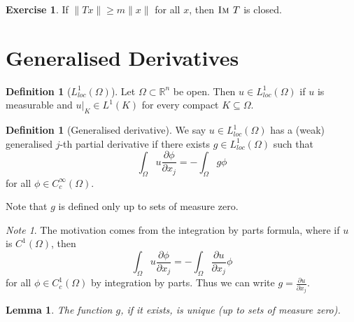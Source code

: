 \documentclass[10pt, oneside, reqno]{amsart}
\theoremstyle{plain}%
\newtheorem{lem}[thm]{Lemma}
\numberwithin{equation}{section}
\theoremstyle{definition}
\newtheorem{defn}[thm]{Definition}
\newtheorem{exer}[thm]{Exercise}
\theoremstyle{remark}
\newtheorem*{note}{Note}
\newcommand{\R}{\mathbb{R}}
\newcommand{\im}{\textsc{Im\ }}
\begin{document}
\begin{exer}
    \label{exer:closed_range_condition}
    If $\| Tx \| \geq m \| x \|$ for all $x$, then $\im T$ is closed.
\end{exer}

\section{Generalised Derivatives} %
\label{sec:generalised_derivatives}

\begin{defn}[$L^1_{loc}(\Omega)$]
    Let $\Omega \subset \R^n$ be open.  Then $u \in L^1_{loc}(\Omega)$ if $u$ is measurable and $u|_K \in L^1(K)$ for every compact $K \subseteq \Omega$. 
\end{defn}

\begin{defn}[Generalised derivative]
    We say $u \in L^1_{loc}(\Omega)$ has a (weak) generalised $j$-th partial derivative if there exists $g \in L^1_{loc}(\Omega)$ such that \begin{equation}
    \label{eq:generalised_derivative}
        \int_\Omega u \frac{\partial \phi}{\partial x_j} = - \int_\Omega g \phi
    \end{equation}
    for all $\phi \in C_c^\infty(\Omega)$.
    
    Note that $g$ is defined only up to sets of measure zero.
\end{defn}

\begin{note}
    The motivation comes from the integration by parts formula, where if $u$ is $C^1(\Omega)$, then \[
        \int_\Omega u \frac{\partial \phi}{\partial x_j} = - \int_\Omega \frac{\partial u}{\partial x_j} \phi
    \] for all $\phi \in C^1_c(\Omega)$ by integration by parts. Thus we can write $g = \frac{\partial u}{\partial x_j}$.   
\end{note}

\begin{lem}
    \label{lem:uniqueness_of_generalised_derivative}
    The function $g$, if it exists, is unique (up to sets of measure zero).  
\end{lem}
\end{document}
